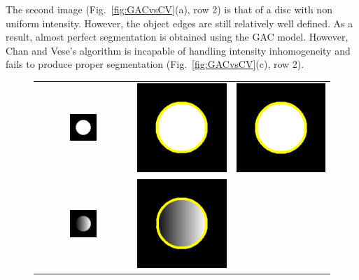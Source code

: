 The second image (Fig.~\ref{fig:GACvsCV}(a), row 2) is that of a disc with non uniform intensity. However, the object edges are still relatively well defined. As a result, almost perfect segmentation is obtained using the GAC model. However, Chan and Vese's algorithm is incapable of handling intensity inhomogeneity and fails to produce proper segmentation (Fig.~\ref{fig:GACvsCV}(c), row 2).
\begin{figure}[htb]
\centering
\renewcommand{\tabcolsep}{0.05cm}
\begin{tabular}{@{}ccc@{}}
\includegraphics[width=0.3\textwidth]{images/demo/GACvsCV/disk}	&
\includegraphics[height=0.3\textwidth]{images/demo/GACvsCV/GAC_disc}	&
\includegraphics[height=0.3\textwidth]{images/demo/GACvsCV/CV_disc}	\\
\includegraphics[width=0.3\textwidth]{images/demo/GACvsCV/inhom}	&
\includegraphics[height=0.3\textwidth]{images/demo/GACvsCV/GAC_inhom}	&

\end{tabular}
\end{figure}
